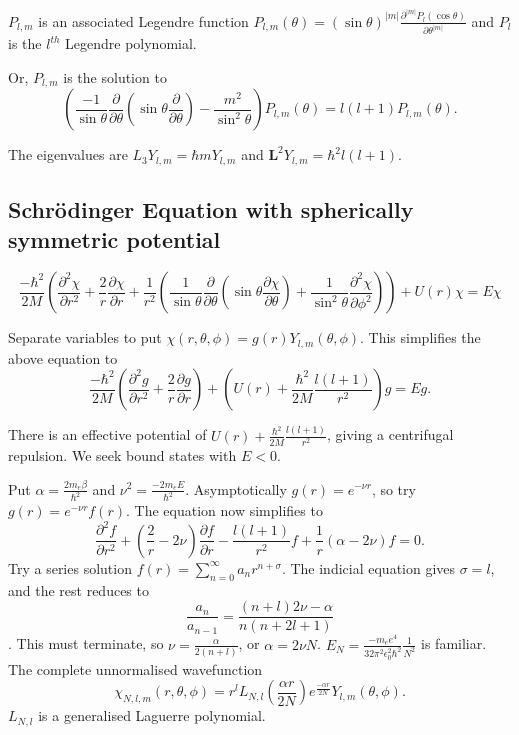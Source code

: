 \documentclass[a4paper]{article}
\newcommand{\eps}{\epsilon_0}
\newcommand{\pd}[2]{\frac{\partial #1}{\partial #2}}
\newcommand{\schrod}{Schr{\"o}dinger }
\newcommand{\abs}[1]{\left| #1 \right|}
\newcommand{\amom}{\mathbf{L}}
\begin{document}
$P_{l,m}$ is an associated Legendre function
$P_{l,m}(\theta) = (\sin \theta)^{\abs{m}}
\pd{^{\abs{m}} P_l \left(\cos \theta \right)}{\theta^{\abs{m}}}
$ and $P_l$ is the 
$l^{th}$ Legendre polynomial.

Or, $P_{l,m}$ is the solution to
\[
\left(
\frac{-1}{\sin \theta}
\pd{}{\theta}
\left(
\sin{\theta}
\pd{}{\theta}
\right)
- \frac{m^2}{\sin^2 \theta}
\right)
P_{l,m}(\theta)
= l(l+1)P_{l,m}(\theta).
\]

The eigenvalues are $L_3 Y_{l,m} = \hbar m Y_{l,m}$ and $\amom^2 Y_{l,m}=\hbar^2 l(l+1)$.

\subsection{\schrod Equation with spherically symmetric potential}

\[
\frac{-\hbar^2}{2 M}
\left(
\pd{^2 \chi}{r^2} + \frac{2}{r}\pd{\chi}{r}
+ \frac{1}{r^2}
\left(
\frac{1}{\sin \theta} \pd{}{\theta}
\left(
\sin \theta \pd{\chi}{\theta}
\right)
+\frac{1}{\sin^2 \theta}\pd{^2 \chi}{\phi^2}
\right)
\right)
+U(r) \chi = E \chi
\]

Separate variables to put $\chi(r,\theta,\phi) = g(r) Y_{l,m}(\theta,\phi)$.
This simplifies the above equation to
\[
\frac{-\hbar^2}{2 M}
\left(
\pd{^2 g}{r^2} + \frac{2}{r} \pd{g}{r}
\right)
+ \left(
U(r) + \frac{\hbar^2}{2 M} \frac{l(l+1)}{r^2}
\right)g = E g.
\]

There is an effective potential of $U(r) + \frac{\hbar^2}{2 M}\frac{l(l+1)}{r^2}$, giving a centrifugal repulsion.  We seek bound states with $E < 0$.

Put $\alpha = \frac{2 m_e \beta}{\hbar^2}$ and $\nu^2 = \frac{-2 m_e E}{\hbar^2}$.  Asymptotically $g(r)=e^{-\nu r}$, so try $g(r) = e^{- \nu r}f(r)$.  The
equation now simplifies to
\[
\pd{^2f}{r^2} + 
\left(
\frac{2}{r} - 2 \nu
\right)
\pd{f}{r}
-\frac{l(l+1)}{r^2}f
+ \frac{1}{r}
\left(
\alpha - 2 \nu
\right)
f = 0.
\]
Try a series solution $f(r) = \sum_{n=0}^{\infty}a_n r^{n+\sigma}$.  The
indicial equation gives $\sigma = l$, and the rest reduces to
\[
\frac{a_n}{a_{n-1}}=\frac{(n+l)2\nu - \alpha}{n(n+2l+1)}
\].  This must terminate, so $\nu = \frac{\alpha}{2(n+l)}$, or
$\alpha = 2\nu N$.  $E_N = \frac{-m_e e^4}{32 \pi^2 \eps^2 \hbar^2}\frac{1}{N^2}$ is familiar.  The complete unnormalised wavefunction
\[
\chi_{N,l,m}(r,\theta,\phi) = r^l L_{N,l}(\frac{\alpha r}{2 N})
e^{\frac{-\alpha r}{2 N}} Y_{l,m}(\theta,\phi).
\]
$L_{N,l}$ is a generalised Laguerre polynomial.
\end{document}
